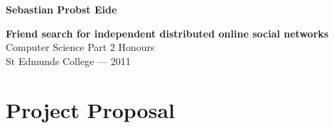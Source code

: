 \documentclass[12pt,twoside,notitlepage]{report}
\begin{document}



\makeatletter
\renewcommand{\@makechapterhead}[1]{%
\vspace*{50 pt}%
{\setlength{\parindent}{0pt} \raggedright \normalfont
\bfseries\Huge\thechapter.\ #1
\par\nobreak\vspace{40 pt}}}
\makeatother


\pagestyle{empty}

\hfill{\small \bf Sebastian Probst Eide}

\vspace*{60mm}
\begin{center}
\Huge
{\bf Friend search for independent distributed online social networks} \\
\vspace*{5mm}
Computer Science Part 2 Honours \\
\vspace*{5mm}
St Edmunds College --- 2011 \\
\vspace*{5mm}
\end{center}

\cleardoublepage

\setcounter{page}{1}
\pagestyle{plain}





\setcounter{page}{1}
\pagestyle{headings}









\appendix
{}


\cleardoublepage
\chapter{Project Proposal}

\end{document}
